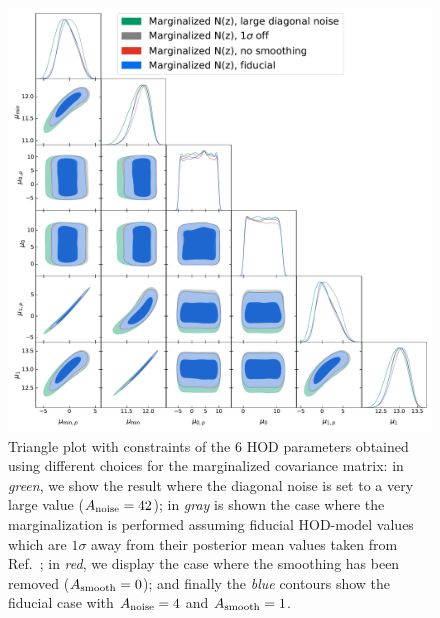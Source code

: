 \documentclass[a4paper,11pt]{article}
\begin{document}
      \begin{figure}[ht]
        \centering
        \includegraphics[width=1.\textwidth]{./triangle_marg_tests}
        \caption{Triangle plot with constraints of the 6 HOD parameters obtained using different choices for the marginalized covariance matrix: in \textit{green}, we show the result where the diagonal noise is set to a very large value ($A_{\rm noise} = 42$); in \textit{gray} is shown the case where the marginalization is performed assuming fiducial HOD-model values which are $1\sigma$ away from their posterior mean values taken from Ref.~\cite{1912.08209}; in \textit{red}, we display the case where the smoothing has been removed ($A_{\rm smooth} = 0$); and finally the \textit{blue} contours show the fiducial case with $A_{\rm noise} = 4$ and $A_{\rm smooth} = 1$.} \label{fig:triangle_marg_tests}
      \end{figure}
\end{document}
